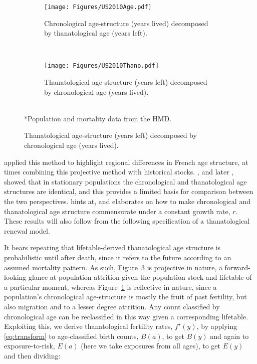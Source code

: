 \documentclass{article}
\begin{document}
\begin{figure}[ht!]
	\caption{2010 US population structure}
	\begin{center}
	\begin{subfigure}{.45\textwidth}
		\caption{Chronological age-structure (years lived) decomposed by
		thanatological age (years left).}
		\label{fig:USdecomp}
		\texttt{[image: Figures/US2010Age.pdf]}
	\end{subfigure}
	~
	\begin{subfigure}{.45\textwidth}
		\caption{Thanatological age-structure (years left) decomposed by chronological
		age (years lived).}
		\label{fig:USrecomp}
		\texttt{[image: Figures/US2010Thano.pdf]}
	\end{subfigure}
	\\
	\small{*Population and mortality data from the HMD.}
	\end{center}
\end{figure}

\citet{brouard1986structure} applied this method to highlight regional
differences in French age structure, at times combining this projective method
with historical stocks. \citet{brouard1989mouvements}, and later
\citet{vaupel2009life}, showed that in stationary populations the chronological
and thanatological age structures are identical, and this provides a
limited basis for comparison between the two perspectives. \citet{wachter2014essential} hints at, and
\citet{vaupel2014stable} elaborates on how to make chronological and
thanatological age structure commensurate under a constant growth rate, $r$.
These results will also follow from the following specification of a
thanatological renewal model.

It bears repeating that lifetable-derived thanatological age structure is probabilistic until after death, since it refers to the future according to an assumed mortality pattern.
As such, Figure~\ref{fig:USrecomp} is projective in nature, a forward-looking
glance at population attrition given the population stock and lifetable of a
particular moment, whereas Figure~\ref{fig:USdecomp} is reflective in nature,
since a population's chronological age-structure is mostly the fruit of past
fertility, but also migration and to a lesser degree attrition. Any count
classified by chronological age can be reclassified in this way given a
corresponding lifetable. Exploiting this, we derive thanatological fertility
rates, $f^\star(y)$, by applying \eqref{eq:transform} to age-classified birth
counts, $B(a)$, to get $B(y)$ and again to exposure-to-risk, $E(a)$ (here we
take exposures from all ages), to get $E(y)$ and then dividing:
\end{document}
